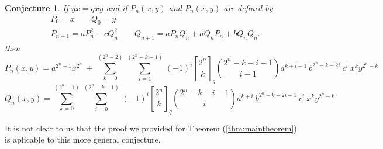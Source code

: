 \documentclass[notitlepage, 10pt]{article}
\newtheorem{conjecture}{Conjecture}
\newcommand{\binomial}[2]{\genfrac{(}{)}{0pt}{}{ #1 }{ #2 }}
\newcommand{\qbinomial}[2]{\genfrac{[}{]}{0pt}{}{ #1 }{ #2 }_q }
\begin{document}
\begin{conjecture}
If $yx=qxy$ and if $P_n(x,y)$ and $P_n(x,y)$ are defined by
\begin{eqnarray*}
& P_0     = x \qquad Q_0 = y \\
& P_{n+1} = a P_n^2 - c Q_n^2  \qquad
Q_{n+1} = a P_n Q_n + a Q_n P_n + b Q_n Q_n .
\end{eqnarray*}
then
\[
P_n(x,y) = a^{2^n-1}x^{2^n}~+~\sum\limits_{k=0}^{(2^n-2)} 
\sum\limits_{i=1}^{~(2^n-k-1)~}  (-1)^{i} 
\qbinomial{2^n }{ k} \binomial{2^n-k-i-1}{i-1}  
a^{k+i-1}~ b^{2^n-k-2i} ~c^i ~x^k y^{2^n-k}
\]
\[
Q_n(x,y) = \sum\limits_{k=0}^{(2^n-1)}
\sum\limits_{i=0}^{~(2^n-k-1)~} (-1)^i 
\qbinomial{2^n }{ k} \binomial{2^n-k-i-1}{i} 
a^{k+i} ~b^{2^n-k-2i-1} ~c^i ~x^k y^{2^n-k}.
\]
\end{conjecture}

It is not clear to us that the proof we provided for Theorem
(\ref{thm:maintheorem}) is aplicable to this more general conjecture.


 
\end{document}
